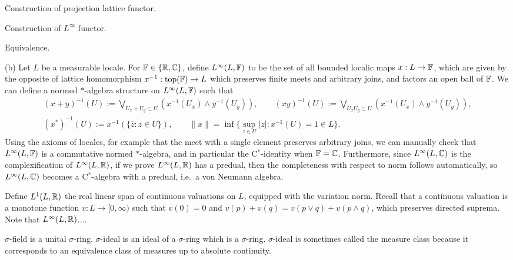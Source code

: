\documentclass{../../large}
\begin{document}
\begin{prb}[]
\begin{parts}
\item Construction of projection lattice functor.
\item Construction of $L^\infty$ functor.
\item Equivalence.
\end{parts}
\end{prb}
\begin{pf}
(b)
Let $L$ be a measurable locale.
For $\mathbb{F}\in\{\mathbb{R},\mathbb{C}\}$, define $L^\infty(L,\mathbb{F})$ to be the set of all bounded localic maps $x:L\to\mathbb{F}$, which are given by the opposite of lattice homomorphism $x^{-1}:\mathrm{top}(\mathbb{F})\to L$ which preserves finite meets and arbitrary joins, and factors an open ball of $\mathbb{F}$.
We can define a normed $*$-algebra structure on $L^\infty(L,\mathbb{F})$ such that
\begin{gather*}
(x+y)^{-1}(U):=\bigvee_{U_x+U_y\subset U}(x^{-1}(U_x)\wedge y^{-1}(U_y)),\qquad(xy)^{-1}(U):=\bigvee_{U_xU_y\subset U}(x^{-1}(U_x)\wedge y^{-1}(U_y)),\\
(x^*)^{-1}(U):=x^{-1}(\{\bar z:z\in U\}),\qquad\|x\|=\inf\{\sup_{z\in U}|z|:x^{-1}(U)=1\in L\}.
\end{gather*}
Using the axioms of locales, for example that the meet with a single element preserves arbitrary joins, we can manually check that $L^\infty(L,\mathbb{F})$ is a commutative normed $*$-algebra, and in particular the C$^*$-identity when $\mathbb{F}=\mathbb{C}$.
Furthermore, since $L^\infty(L,\mathbb{C})$ is the complexification of $L^\infty(L,\mathbb{R})$, if we prove $L^\infty(L,\mathbb{R})$ has a predual, then the completeness with respect to norm follows automatically, so $L^\infty(L,\mathbb{C})$ becomes a C$^*$-algebra with a predual, i.e.~a von Neumann algebra.

Define $L^1(L,\mathbb{R})$ the real linear span of continuous valuations on $L$, equipped with the variation norm.
Recall that a continuous valuation is a monotone function $v:L\to[0,\infty)$ such that $v(0)=0$ and $v(p)+v(q)=v(p\vee q)+v(p\wedge q)$, which preserves directed suprema.
Note that $L^\infty(L,\mathbb{R})$....
\end{pf}




$\sigma$-field is a unital $\sigma$-ring.
$\sigma$-ideal is an ideal of a $\sigma$-ring which is a $\sigma$-ring.
$\sigma$-ideal is sometimes called the measure class because it corresponds to an equivalence class of measures up to absolute continuity.
\end{document}
